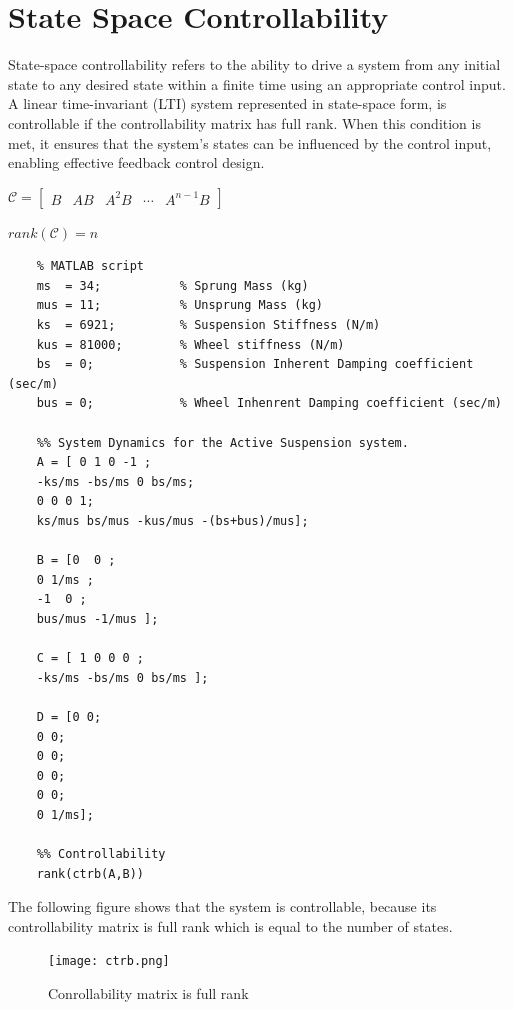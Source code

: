 \section{State Space Controllability}
State-space controllability refers to the ability to drive a system from any initial state to any desired state within a finite time using an appropriate control input. A linear time-invariant (LTI) system represented in state-space form, is controllable if the controllability matrix has full rank. When this condition is met, it ensures that the system's states can be influenced by the control input, enabling effective feedback control design.\newline

$\mathcal{C} = \left[ \begin{matrix}
	B & AB & A^2B & \cdots & A^{n-1}B
\end{matrix} \right]$\newline

$rank(\mathcal{C}) = n$


\begin{verbatim}
	% MATLAB script
	ms  = 34;           % Sprung Mass (kg)
	mus = 11;           % Unsprung Mass (kg)
	ks  = 6921;         % Suspension Stiffness (N/m)
	kus = 81000;        % Wheel stiffness (N/m)
	bs  = 0;            % Suspension Inherent Damping coefficient (sec/m)
	bus = 0;            % Wheel Inhenrent Damping coefficient (sec/m)
	
	%% System Dynamics for the Active Suspension system.
	A = [ 0 1 0 -1 ;
	-ks/ms -bs/ms 0 bs/ms;
	0 0 0 1; 
	ks/mus bs/mus -kus/mus -(bs+bus)/mus];
	
	B = [0  0 ; 
	0 1/ms ; 
	-1  0 ;
	bus/mus -1/mus ];
	
	C = [ 1 0 0 0 ; 
	-ks/ms -bs/ms 0 bs/ms ];
	
	D = [0 0;
	0 0;
	0 0;
	0 0;
	0 0;
	0 1/ms];
	
	%% Controllability
	rank(ctrb(A,B))
\end{verbatim}

The following figure shows that the system is controllable, because its controllability matrix is full rank which is equal to the number of states.\newline

\begin{figure}[H]
	\centering
	\texttt{[image: ctrb.png]}
	\caption{Conrollability matrix is full rank}
	\label{fig:ctrb}	
\end{figure}


